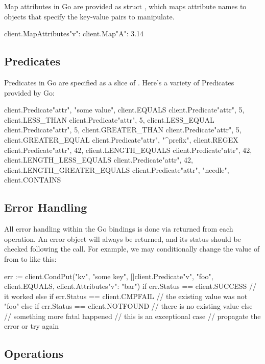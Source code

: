 Map attributes in Go are provided as struct , which
maps attribute names to  objects that specify the key-value
pairs to manipulate.

\begin{gocode}
client.MapAttributes{"v": client.Map{"A": 3.14}}
\end{gocode}

\subsection{Predicates}
\label{sec:api:go-client:predicates}

Predicates in Go are specified as a slice of .  Here's a
variety of Predicates provided by Go:

\begin{gocode}
client.Predicate{"attr", "some value", client.EQUALS}
client.Predicate{"attr", 5, client.LESS_THAN}
client.Predicate{"attr", 5, client.LESS_EQUAL}
client.Predicate{"attr", 5, client.GREATER_THAN}
client.Predicate{"attr", 5, client.GREATER_EQUAL}
client.Predicate{"attr", "^prefix", client.REGEX}
client.Predicate{"attr", 42, client.LENGTH_EQUALS}
client.Predicate{"attr", 42, client.LENGTH_LESS_EQUALS}
client.Predicate{"attr", 42, client.LENGTH_GREATER_EQUALS}
client.Predicate{"attr", "needle", client.CONTAINS}
\end{gocode}

\subsection{Error Handling}
\label{sec:api:go-client:error-handling}

All error handling within the Go bindings is done via 
returned from each operation.  An error object will always be returned, and its
status should be checked following the call.  For example, we may conditionally
change the value of  from  to  like this:

\begin{gocode}
err := client.CondPut("kv", "some key",
        []client.Predicate{{"v", "foo", client.EQUALS}},
        client.Attributes{"v": "bar"})
if err.Status == client.SUCCESS {
    // it worked
} else if err.Status == client.CMPFAIL {
    // the existing value was not "foo"
} else if err.Status == client.NOTFOUND {
    // there is no existing value
} else {
    // something more fatal happened
    // this is an exceptional case
    // propagate the error or try again
}
\end{gocode}

\subsection{Operations}
\label{sec:api:go-client:ops}


